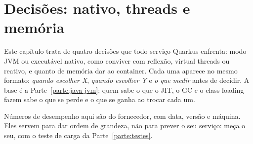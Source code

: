 \chapter{Decisões: nativo, threads e memória}
\label{cap:decisoes-quarkus}

\proximasaulas

Este capítulo trata de quatro decisões que todo serviço Quarkus
enfrenta: modo JVM ou executável nativo, como conviver com reflexão,
virtual threads ou reativo, e quanto de memória dar ao container. Cada
uma aparece no mesmo formato: \emph{quando escolher X}, \emph{quando
escolher Y} e \emph{o que medir} antes de decidir. A base é a Parte~\ref{parte:java-jvm}:
quem sabe o que o JIT, o GC e o class loading fazem sabe o que se perde
e o que se ganha ao trocar cada um.

Números de desempenho aqui são do fornecedor, com data, versão e
máquina. Eles servem para dar ordem de grandeza, não para prever o seu
serviço: meça o seu, com o teste de carga da Parte~\ref{parte:testes}.







